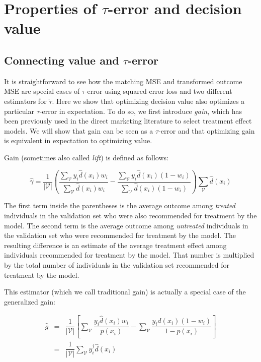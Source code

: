 \section{Properties of $\tau$-error and decision value}
\label{theory}

\subsection{Connecting value and $\tau$-error}
\label{sec:gain-value}

It is straightforward to see how the matching MSE and transformed outcome MSE are special cases of $\tau$-error using squared-error loss and two different estimators for $\check\tau$. Here we show that optimizing decision value also optimizes a particular $\tau$-error in expectation. To do so, we first introduce \emph{gain}, which has been previously used in the direct marketing literature to select treatment effect models. We will show that gain can be seen as a $\tau$-error and that optimizing gain is equivalent in expectation to optimizing value. 

Gain (sometimes also called \emph{lift}) is defined as follows:

\begin{equation}
\label{gain-basic}
	\hat \gamma = \frac{1}{|\mathcal V |} \left(
		  \frac{\sum_{\mathcal{V}} y_i  \hat d(x_i) w_i}{\sum_{\mathcal{V}}  \hat d(x_i) w_i} - 
		  \frac{\sum_{\mathcal{V}} y_i  \hat d(x_i) (1-w_i)}{\sum_{\mathcal{V}}  \hat d(x_i)  (1-w_i)} 
		  \right)
		  \sum_{\mathcal{V}} \hat d(x_i) 
\end{equation}

The first term inside the parentheses is the average outcome among \emph{treated} individuals in the validation set who were also recommended for treatment by the model. The second term is the average outcome among \emph{untreated} individuals in the validation set who were recommended for treatment by the model. The resulting difference is an estimate of the average treatment effect among individuals recommended for treatment by the model. That number is multiplied by the total number of individuals in the validation set recommended for treatment by the model. 

This estimator (which we call traditional gain) is actually a special case of the generalized gain:

\begin{equation}
\label{gain}
\begin{array}{rcl}
	\hat g & =& \dfrac{1}{|\mathcal V |} \left[ \sum_{\mathcal{V}} \dfrac{y_i  \hat d(x_i) w_i}{p(x_i)} - \sum_{\mathcal{V}} \dfrac{y_i  \hat d(x_i) (1-w_i)}{1-p(x_i)} \right] \\
	&=& \dfrac{1}{|\mathcal V |} \sum_{\mathcal{V}} y^{\dagger}_i \hat d(x_i)
\end{array}
\end{equation}


